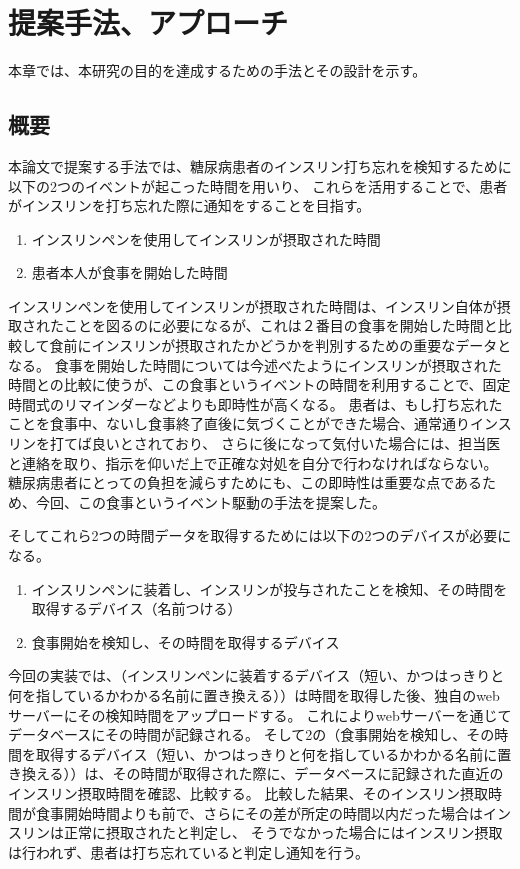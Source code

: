 \chapter{提案手法、アプローチ}
\label{chap:design}

本章では、本研究の目的を達成するための手法とその設計を示す。

\section{概要}

本論文で提案する手法では、糖尿病患者のインスリン打ち忘れを検知するために以下の2つのイベントが起こった時間を用いり、
これらを活用することで、患者がインスリンを打ち忘れた際に通知をすることを目指す。

\begin{enumerate}
  \item インスリンペンを使用してインスリンが摂取された時間
  \item 患者本人が食事を開始した時間
\end{enumerate}

インスリンペンを使用してインスリンが摂取された時間は、インスリン自体が摂取されたことを図るのに必要になるが、これは２番目の食事を開始した時間と比較して食前にインスリンが摂取されたかどうかを判別するための重要なデータとなる。
食事を開始した時間については今述べたようにインスリンが摂取された時間との比較に使うが、この食事というイベントの時間を利用することで、固定時間式のリマインダーなどよりも即時性が高くなる。
患者は、もし打ち忘れたことを食事中、ないし食事終了直後に気づくことができた場合、通常通りインスリンを打てば良いとされており、\cite{insulin_qa_sakaemachi_nishi} \cite{insulin_qa_akaike}
さらに後になって気付いた場合には、担当医と連絡を取り、指示を仰いだ上で正確な対処を自分で行わなければならない。\cite{insulin_qa_senior}
糖尿病患者にとっての負担を減らすためにも、この即時性は重要な点であるため、今回、この食事というイベント駆動の手法を提案した。

そしてこれら2つの時間データを取得するためには以下の2つのデバイスが必要になる。

\begin{enumerate}
  \item インスリンペンに装着し、インスリンが投与されたことを検知、その時間を取得するデバイス（名前つける）
  \item 食事開始を検知し、その時間を取得するデバイス
\end{enumerate}

今回の実装では、（インスリンペンに装着するデバイス（短い、かつはっきりと何を指しているかわかる名前に置き換える））は時間を取得した後、独自のwebサーバーにその検知時間をアップロードする。
これによりwebサーバーを通じてデータベースにその時間が記録される。
そして2の（食事開始を検知し、その時間を取得するデバイス（短い、かつはっきりと何を指しているかわかる名前に置き換える））は、その時間が取得された際に、データベースに記録された直近のインスリン摂取時間を確認、比較する。
比較した結果、そのインスリン摂取時間が食事開始時間よりも前で、さらにその差が所定の時間以内だった場合はインスリンは正常に摂取されたと判定し、
そうでなかった場合にはインスリン摂取は行われず、患者は打ち忘れていると判定し通知を行う。

